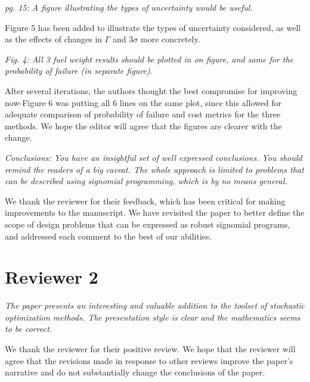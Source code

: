 \documentclass[11pt]{article}
\begin{document}
    \textit{pg. 15: A figure illustrating the types of uncertainty would be useful.}

    Figure 5 has been added to illustrate the types of uncertainty considered,
    as well as the effects of changes in $\Gamma$ and $3\sigma$ more concretely.
    \bigskip

    \textit{Fig. 4: All 3 fuel weight results should be plotted in on figure,
    and same for the probability of failure (in separate figure).}

    After several iterations, the authors thought the best compromise for improving now-Figure 6
    was putting
    all 6 lines on the same plot, since this allowed for adequate comparison of probability of
    failure and cost metrics for the three methods. We hope the editor will agree that
    the figures are clearer with the change.
    \bigskip

    \textit{Conclusions: You have an insightful set of well expressed conclusions.
    You should remind the readers of a big caveat. The whole approach is limited to problems
    that can be described using signomial programming, which is by no means general.}

    We thank the reviewer for their feedback, which has been critical for making improvements to the manuscript. We
    have revisited the paper to better define the scope of design problems that can be expressed as robust signomial
    programs, and addressed each comment to the best of our abilities.
    \bigskip

    \section{Reviewer 2}

    \textit{The paper presents an interesting and valuable addition to the toolset of stochastic optimization methods.
    The presentation style is clear and the mathematics seems to be correct.}

    We thank the reviewer for their positive review. We hope that the reviewer
    will agree that the revisions made in response to other reviews improve the paper's narrative
    and do not substantially change the conclusions of the paper. 
    \bigskip
\end{document}
